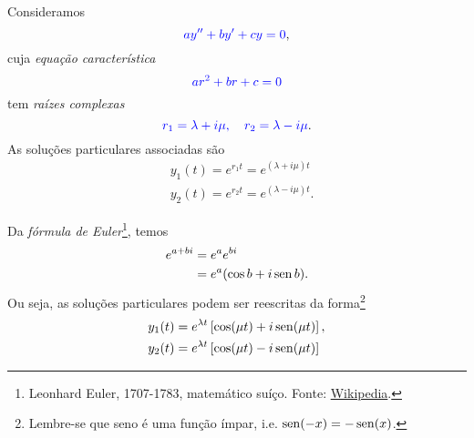 Consideramos
\begin{equation}\label{eq:ed2o_hcc_rc}
  {\color{blue}ay'' + by' + cy = 0},
\end{equation}
cuja \emph{equação característica}
\begin{equation}
  {\color{blue}ar^2 + br + c = 0}
\end{equation}
tem \emph{raízes complexas}
\begin{equation}
  {\color{blue}r_1 = \lambda + i\mu,\quad r_2 = \lambda - i\mu}.
\end{equation}
As soluções particulares associadas são
\begin{align}
  &y_1(t) = e^{r_1t} = e^{(\lambda + i\mu)t} \\
  &y_2(t) = e^{r_2t} = e^{(\lambda - i\mu)t}.
\end{align}

Da \emph{fórmula de Euler}\footnote{Leonhard Euler, 1707-1783, matemático suíço. Fonte: \href{https://en.wikipedia.org/wiki/Leonhard_Euler}{Wikipedia}.}, temos
\begin{align}
  e^{a+bi} &= e^ae^{bi}\\
           &= e^a(\cos b + i\operatorname{sen} b).
\end{align}
Ou seja, as soluções particulares podem ser reescritas da forma\footnote{Lembre-se que seno é uma função ímpar, i.e. $\operatorname{sen}(-x) = -\operatorname{sen}(x)$.}
\begin{align}
  &y_1(t) = e^{\lambda t}\left[\cos(\mu t) + i\operatorname{sen}(\mu t)\right], \\
  &y_2(t) = e^{\lambda t}\left[\cos(\mu t) - i\operatorname{sen}(\mu t)\right]
\end{align}

